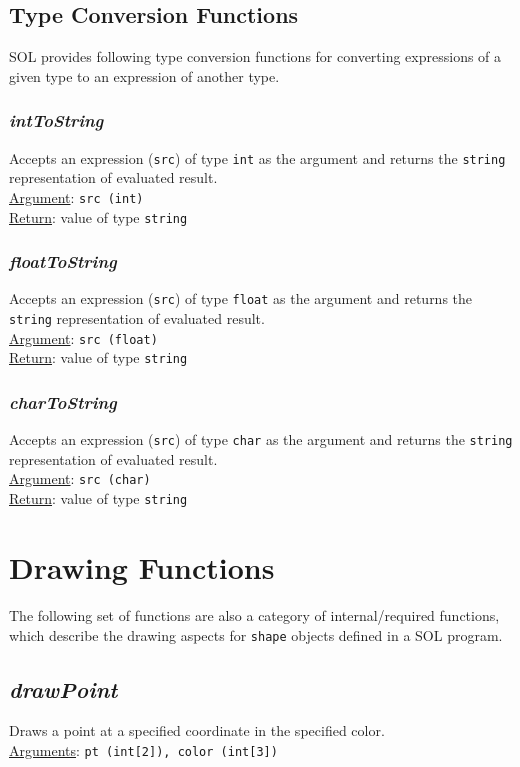     \subsection{Type Conversion Functions}
    SOL provides following type conversion functions for converting expressions of a given type to an expression of another type.

    \subsubsection{\textit{intToString}}
    Accepts an expression (\texttt{src}) of type \texttt{int} as the argument and returns the \texttt{string} representation of evaluated result.\\
    \underline{Argument}: \texttt{src (int)}\\
    \underline{Return}: value of type \texttt{string}

    \subsubsection{\textit{floatToString}}
    Accepts an expression (\texttt{src}) of type \texttt{float} as the argument and returns the \texttt{string} representation of evaluated result.\\
    \underline{Argument}: \texttt{src (float)}\\
    \underline{Return}: value of type \texttt{string}

    \subsubsection{\textit{charToString}}
    Accepts an expression (\texttt{src}) of type \texttt{char} as the argument and returns the \texttt{string} representation of evaluated result.\\
    \underline{Argument}: \texttt{src (char)}\\
    \underline{Return}: value of type \texttt{string}

\section{Drawing Functions}
The following set of functions are also a category of internal/required functions, which describe the drawing aspects for \texttt{shape} objects defined in a SOL program.

    \subsection{\textit{drawPoint}}
    Draws a point at a specified coordinate in the specified color.\\
    \underline{Arguments}: \texttt{pt (int[2]), color (int[3])}

